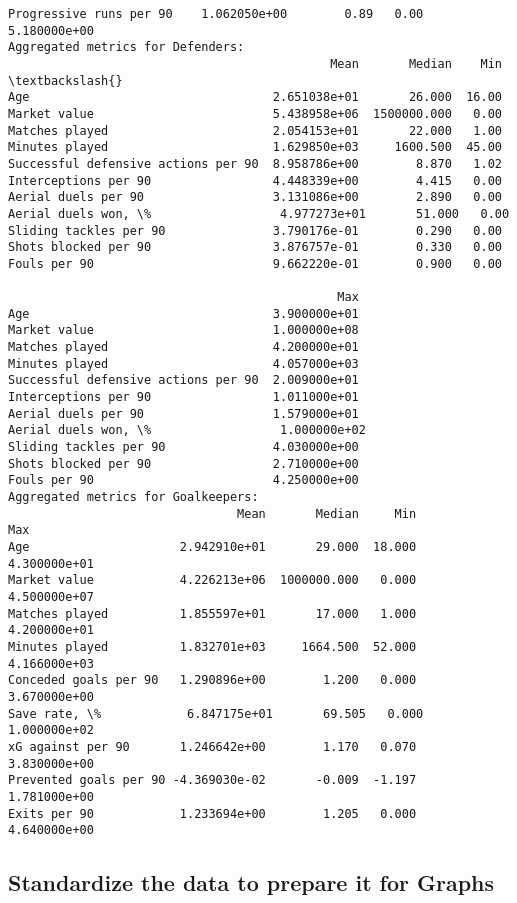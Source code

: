 \documentclass[11pt]{article}
\begin{document}
\begin{Verbatim}[commandchars=\\\{\}]
Progressive runs per 90    1.062050e+00        0.89   0.00  5.180000e+00
Aggregated metrics for Defenders:
                                             Mean       Median    Min  \textbackslash{}
Age                                  2.651038e+01       26.000  16.00
Market value                         5.438958e+06  1500000.000   0.00
Matches played                       2.054153e+01       22.000   1.00
Minutes played                       1.629850e+03     1600.500  45.00
Successful defensive actions per 90  8.958786e+00        8.870   1.02
Interceptions per 90                 4.448339e+00        4.415   0.00
Aerial duels per 90                  3.131086e+00        2.890   0.00
Aerial duels won, \%                  4.977273e+01       51.000   0.00
Sliding tackles per 90               3.790176e-01        0.290   0.00
Shots blocked per 90                 3.876757e-01        0.330   0.00
Fouls per 90                         9.662220e-01        0.900   0.00

                                              Max
Age                                  3.900000e+01
Market value                         1.000000e+08
Matches played                       4.200000e+01
Minutes played                       4.057000e+03
Successful defensive actions per 90  2.009000e+01
Interceptions per 90                 1.011000e+01
Aerial duels per 90                  1.579000e+01
Aerial duels won, \%                  1.000000e+02
Sliding tackles per 90               4.030000e+00
Shots blocked per 90                 2.710000e+00
Fouls per 90                         4.250000e+00
Aggregated metrics for Goalkeepers:
                                Mean       Median     Min           Max
Age                     2.942910e+01       29.000  18.000  4.300000e+01
Market value            4.226213e+06  1000000.000   0.000  4.500000e+07
Matches played          1.855597e+01       17.000   1.000  4.200000e+01
Minutes played          1.832701e+03     1664.500  52.000  4.166000e+03
Conceded goals per 90   1.290896e+00        1.200   0.000  3.670000e+00
Save rate, \%            6.847175e+01       69.505   0.000  1.000000e+02
xG against per 90       1.246642e+00        1.170   0.070  3.830000e+00
Prevented goals per 90 -4.369030e-02       -0.009  -1.197  1.781000e+00
Exits per 90            1.233694e+00        1.205   0.000  4.640000e+00
    \end{Verbatim}

    \subsection{Standardize the data to prepare it for
Graphs}\label{standardize-the-data-to-prepare-it-for-graphs}
\end{document}
